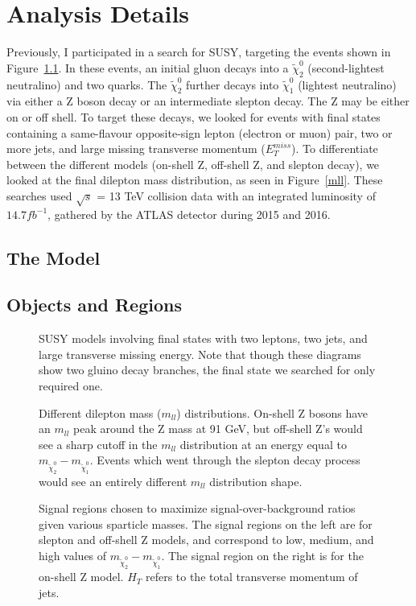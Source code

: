 \chapter{Analysis Details}

Previously, I participated in a search for SUSY, targeting the events shown in Figure~\ref{SUSY_2l2j}. In these events, an initial gluon decays into a $\tilde{\chi}^0_2$ (second-lightest neutralino) and two quarks. The $\tilde{\chi}^0_2$ further decays into $\tilde{\chi}^0_1$ (lightest neutralino) via either a Z boson decay or an intermediate slepton decay. The Z may be either on or off shell. To target these decays, we looked for events with final states containing a same-flavour opposite-sign lepton (electron or muon) pair, two or more jets, and large missing transverse momentum ($E_T^{miss}$). To differentiate between the different models (on-shell Z, off-shell Z, and slepton decay), we looked at the final dilepton mass distribution, as seen in Figure~\ref{mll}. These searches used $\sqrt{s}$ = 13 TeV collision data with an integrated luminosity of $14.7 fb^{-1}$, gathered by the ATLAS detector during 2015 and 2016.

\section{The Model}

\section{Objects and Regions}

\begin{figure}[t]
    \centering
    \caption{SUSY models involving final states with two leptons, two jets, and large transverse missing energy. Note that though these diagrams show two gluino decay branches, the final state we searched for only required one.}
    \label{SUSY_2l2j}
\end{figure}

\begin{figure}[t]
    \centering
    \caption{Different dilepton mass ($m_{ll}$) distributions. On-shell Z bosons have an $m_{ll}$ peak around the Z mass at 91 GeV, but off-shell Z's would see a sharp cutoff in the $m_{ll}$ distribution at an energy equal to $m_{\tilde{\chi}^0_2} - m_{\tilde{\chi}^0_1}$. Events which went through the slepton decay process would see an entirely different $m_{ll}$ distribution shape.}
    \label{mll}
    
	\centering
    \caption{Signal regions chosen to maximize signal-over-background ratios given various sparticle masses. The signal regions on the left are for slepton and off-shell Z models, and correspond to low, medium, and high values of $m_{\tilde{\chi}^0_2} - m_{\tilde{\chi}^0_1}$. The signal region on the right is for the on-shell Z model. $H_T$ refers to the total transverse momentum of jets.}
    \label{signal_regions}
\end{figure}

